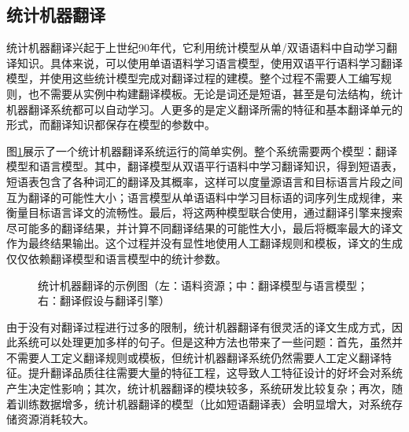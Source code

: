 
\subsection{统计机器翻译}

\parinterval 统计机器翻译兴起于上世纪90年代，它利用统计模型从单/双语语料中自动学习翻译知识。具体来说，可以使用单语语料学习语言模型，使用双语平行语料学习翻译模型，并使用这些统计模型完成对翻译过程的建模。整个过程不需要人工编写规则，也不需要从实例中构建翻译模板。无论是词还是短语，甚至是句法结构，统计机器翻译系统都可以自动学习。人更多的是定义翻译所需的特征和基本翻译单元的形式，而翻译知识都保存在模型的参数中。

\parinterval 图\ref{fig:1-14}展示了一个统计机器翻译系统运行的简单实例。整个系统需要两个模型：翻译模型和语言模型。其中，翻译模型从双语平行语料中学习翻译知识，得到短语表，短语表包含了各种词汇的翻译及其概率，这样可以度量源语言和目标语言片段之间互为翻译的可能性大小；语言模型从单语语料中学习目标语的词序列生成规律，来衡量目标语言译文的流畅性。最后，将这两种模型联合使用，通过翻译引擎来搜索尽可能多的翻译结果，并计算不同翻译结果的可能性大小，最后将概率最大的译文作为最终结果输出。这个过程并没有显性地使用人工翻译规则和模板，译文的生成仅仅依赖翻译模型和语言模型中的统计参数。

\begin{figure}[htp]
    \centering

    \caption{统计机器翻译的示例图（左：语料资源；中：翻译模型与语言模型；右：翻译假设与翻译引擎）}
    \label{fig:1-14}
\end{figure}

\parinterval 由于没有对翻译过程进行过多的限制，统计机器翻译有很灵活的译文生成方式，因此系统可以处理更加多样的句子。但是这种方法也带来了一些问题：首先，虽然并不需要人工定义翻译规则或模板，但统计机器翻译系统仍然需要人工定义翻译特征。提升翻译品质往往需要大量的特征工程，这导致人工特征设计的好坏会对系统产生决定性影响；其次，统计机器翻译的模块较多，系统研发比较复杂；再次，随着训练数据增多，统计机器翻译的模型（比如短语翻译表）会明显增大，对系统存储资源消耗较大。


